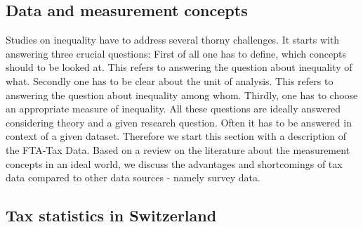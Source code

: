 \documentclass[twoside]{article}\usepackage[]{graphicx}\usepackage[]{color}
\begin{document}
\begin{multicols}{2}



\section{Data and measurement concepts}

Studies on inequality have to address several thorny challenges. It starts with answering three crucial questions: First of all one has to define, which concepts should to be looked at. This refers to answering the question about inequality of what. Secondly one has to be clear about the unit of analysis. This refers to answering the question about inequality among whom. Thirdly, one has to choose an appropriate measure of inequality. All these questions are ideally answered considering theory and a given research question. Often it has to be answered in context of a given dataset. Therefore we start this section with a description of the FTA-Tax Data. Based on a review on the literature about the measurement concepts in an ideal world, we discuss the advantages and shortcomings of tax data compared to other data sources - namely survey data. 


\subsection{Tax statistics in Switzerland}


\end{multicols}
\end{document}
